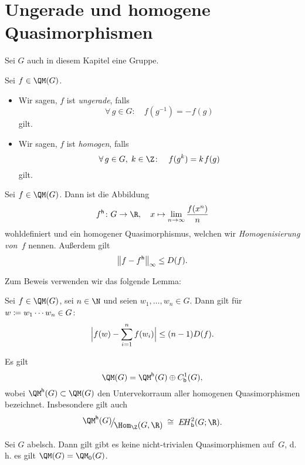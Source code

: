 \chapter{Ungerade und homogene Quasimorphismen}
\begin{thSetup}
    Sei $G$ auch in diesem Kapitel eine Gruppe.
\end{thSetup}

\begin{thDef}
    Sei $f\in\QM(G)$.
    \begin{itemize}
        \item
            Wir sagen, $f$ ist \emph{ungerade}, falls
            \[ \forall\,g\in G\colon\quad
                f(g^{-1}) = -f(g)
            \]
            gilt.
            
        \item
            Wir sagen, $f$ ist \emph{homogen}, falls
            \[ \forall\,g\in G,\;k\in\Z\colon\quad
                f(g^k) = k \mkern2mu f(g)
            \]
            gilt.
    \end{itemize}
\end{thDef}

\begin{thProposition}[Homogenisierung]
    Sei $f\in\QM(G)$. Dann ist die Abbildung
    \[ f\homo \colon G \to \R, \quad
        x\mapsto \lim_{n\to\infty} \frac{f(x^n)}{n}
    \]
    wohldefiniert und ein homogener Quasimorphismus, welchen wir
    \emph{Homogenisierung von~$f$} nennen. Außerdem gilt
    \[ \norm[\big]{f-f\homo}_\supr \leq D(f)  . \]
\end{thProposition}

Zum Beweis verwenden wir das folgende Lemma:

\begin{thLemma}
    Sei $f\in\QM(G)$, sei $n\in\N$ und seien
    $w_1,\dots,w_n\in G$. Dann gilt für $w\defeq w_1\cdots w_n\in G$:
    \[ \abs[\Big]{ f(w) - \isum^n f(w_i) } \leq (n-1) D(f)  . \]
\end{thLemma}

\begin{thKorollar}
    Es gilt
    \[ \QM(G) = \QM\homo(G) \oplus \Cb^1(G)  , \]
    wobei $\QM\homo(G) \subset \QM(G)$ den Untervekorraum aller homogenen
    Quasimorphismen bezeichnet. Insbesondere gilt auch
    \[ \Quot{\QM\homo(G)}{\Hom_\Z(G,\R)} \;\cong\; \EHb^2(G;\R)  . \]
\end{thKorollar}

\begin{thKorollar}
    Sei $G$ abelsch. Dann gilt gibt es keine nicht-trivialen
    Quasimorphismen auf~$G$, d.\,h. es gilt $\QM(G) = \QM_0(G)$.
\end{thKorollar}
